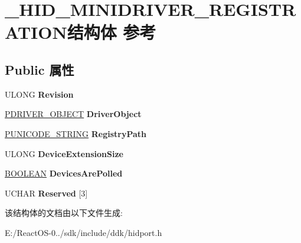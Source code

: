 \hypertarget{struct___h_i_d___m_i_n_i_d_r_i_v_e_r___r_e_g_i_s_t_r_a_t_i_o_n}{}\section{\+\_\+\+H\+I\+D\+\_\+\+M\+I\+N\+I\+D\+R\+I\+V\+E\+R\+\_\+\+R\+E\+G\+I\+S\+T\+R\+A\+T\+I\+O\+N结构体 参考}
\label{struct___h_i_d___m_i_n_i_d_r_i_v_e_r___r_e_g_i_s_t_r_a_t_i_o_n}
\subsection*{Public 属性}
\begin{DoxyCompactItemize}
\item 
\mbox{\label{struct___h_i_d___m_i_n_i_d_r_i_v_e_r___r_e_g_i_s_t_r_a_t_i_o_n_a92821c5d2d195beba84f720548124dd6}} 
U\+L\+O\+NG {\bfseries Revision}
\item 
\mbox{\label{struct___h_i_d___m_i_n_i_d_r_i_v_e_r___r_e_g_i_s_t_r_a_t_i_o_n_a352bf76b785c9c8f7576d4066381078f}} 
\hyperlink{struct___d_r_i_v_e_r___o_b_j_e_c_t}{P\+D\+R\+I\+V\+E\+R\+\_\+\+O\+B\+J\+E\+CT} {\bfseries Driver\+Object}
\item 
\mbox{\label{struct___h_i_d___m_i_n_i_d_r_i_v_e_r___r_e_g_i_s_t_r_a_t_i_o_n_a246331b96c2c7abd4c15cbfdc35f9d66}} 
\hyperlink{struct___u_n_i_c_o_d_e___s_t_r_i_n_g}{P\+U\+N\+I\+C\+O\+D\+E\+\_\+\+S\+T\+R\+I\+NG} {\bfseries Registry\+Path}
\item 
\mbox{\label{struct___h_i_d___m_i_n_i_d_r_i_v_e_r___r_e_g_i_s_t_r_a_t_i_o_n_aa4f524fe829b2c98a69e99863fdeac28}} 
U\+L\+O\+NG {\bfseries Device\+Extension\+Size}
\item 
\mbox{\label{struct___h_i_d___m_i_n_i_d_r_i_v_e_r___r_e_g_i_s_t_r_a_t_i_o_n_a2cb7e92b5340e90a93fa26d3db4b7b34}} 
\hyperlink{_processor_bind_8h_a112e3146cb38b6ee95e64d85842e380a}{B\+O\+O\+L\+E\+AN} {\bfseries Devices\+Are\+Polled}
\item 
\mbox{\label{struct___h_i_d___m_i_n_i_d_r_i_v_e_r___r_e_g_i_s_t_r_a_t_i_o_n_a7cd8f5631b31696e8e4dcf4d7a1d7b1f}} 
U\+C\+H\+AR {\bfseries Reserved} \mbox{[}3\mbox{]}
\end{DoxyCompactItemize}


该结构体的文档由以下文件生成\+:\begin{DoxyCompactItemize}
\item 
E\+:/\+React\+O\+S-\/0../sdk/include/ddk/hidport.\+h\end{DoxyCompactItemize}
